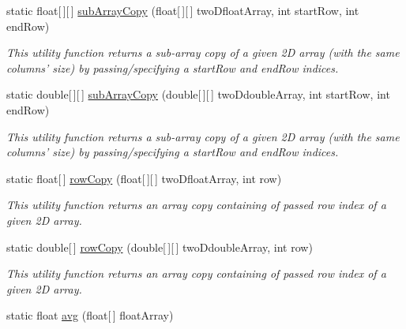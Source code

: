 \begin{DoxyCompactItemize}
static float\mbox{[}$\,$\mbox{]}\mbox{[}$\,$\mbox{]} \hyperlink{classuk_1_1ac_1_1dmu_1_1iesd_1_1cascade_1_1util_1_1_array_utils_ab550992e23c72fbb9ed70648d3d0f26b}{sub\-Array\-Copy} (float\mbox{[}$\,$\mbox{]}\mbox{[}$\,$\mbox{]} two\-Dfloat\-Array, int start\-Row, int end\-Row)
\begin{DoxyCompactList}\small\item\em This utility function returns a sub-\/array copy of a given 2\-D array (with the same columns' size) by passing/specifying a start\-Row and end\-Row indices. \end{DoxyCompactList}\item 
static double\mbox{[}$\,$\mbox{]}\mbox{[}$\,$\mbox{]} \hyperlink{classuk_1_1ac_1_1dmu_1_1iesd_1_1cascade_1_1util_1_1_array_utils_a0ef03bf6775473a98e596007198604c3}{sub\-Array\-Copy} (double\mbox{[}$\,$\mbox{]}\mbox{[}$\,$\mbox{]} two\-Ddouble\-Array, int start\-Row, int end\-Row)
\begin{DoxyCompactList}\small\item\em This utility function returns a sub-\/array copy of a given 2\-D array (with the same columns' size) by passing/specifying a start\-Row and end\-Row indices. \end{DoxyCompactList}\item 
static float\mbox{[}$\,$\mbox{]} \hyperlink{classuk_1_1ac_1_1dmu_1_1iesd_1_1cascade_1_1util_1_1_array_utils_abfb74f4b5844ac5e151ccb31bb13ccfb}{row\-Copy} (float\mbox{[}$\,$\mbox{]}\mbox{[}$\,$\mbox{]} two\-Dfloat\-Array, int row)
\begin{DoxyCompactList}\small\item\em This utility function returns an array copy containing of passed row index of a given 2\-D array. \end{DoxyCompactList}\item 
static double\mbox{[}$\,$\mbox{]} \hyperlink{classuk_1_1ac_1_1dmu_1_1iesd_1_1cascade_1_1util_1_1_array_utils_a46123e3dc5762c8a73ff442df0dc6683}{row\-Copy} (double\mbox{[}$\,$\mbox{]}\mbox{[}$\,$\mbox{]} two\-Ddouble\-Array, int row)
\begin{DoxyCompactList}\small\item\em This utility function returns an array copy containing of passed row index of a given 2\-D array. \end{DoxyCompactList}\item 
static float \hyperlink{classuk_1_1ac_1_1dmu_1_1iesd_1_1cascade_1_1util_1_1_array_utils_a01e47516d4413ce57f3f2cfa96b6f7b3}{avg} (float\mbox{[}$\,$\mbox{]} float\-Array)

\end{DoxyCompactItemize}
